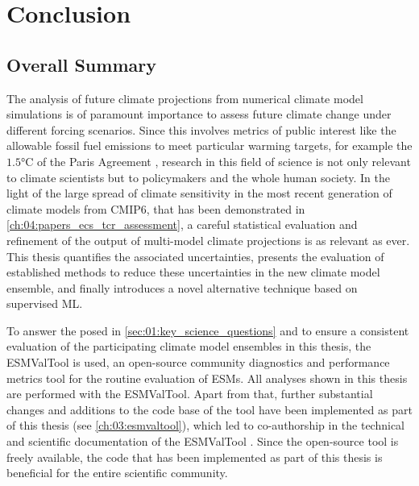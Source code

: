 
%



\chapter{Conclusion}
\label{ch:07:conclusion}


\section{Overall Summary}
\label{sec:07:overall_summary}

The analysis of future climate projections from numerical climate model
simulations is of paramount importance to assess future climate change under
different forcing scenarios. Since this involves metrics of public interest
like the allowable fossil fuel emissions to meet particular warming targets,
for example the $1.5 \unit{\degreeCelsius}$ of the Paris Agreement
\autocite{UNFCCC2015}, research in this field of science is not only relevant
to climate scientists but to policymakers and the whole human society. In the
light of the large spread of climate sensitivity in the most recent generation
of climate models from \acs{CMIP}6, that has been demonstrated in
\cref{ch:04:papers_ecs_tcr_assessment}, a careful statistical evaluation and
refinement of the output of multi-model climate projections is as relevant as
ever. This thesis quantifies the associated uncertainties, presents the
evaluation of established methods to reduce these uncertainties in the new
climate model ensemble, and finally introduces a novel alternative technique
based on supervised \ac{ML}.

To answer the  posed in
\cref{sec:01:key_science_questions} and to ensure a consistent evaluation of
the participating climate model ensembles in this thesis, the \ac{ESMValTool}
is used, an open-source community diagnostics and performance metrics tool for
the routine evaluation of \acp{ESM}. All analyses shown in this thesis are
performed with the \ac{ESMValTool}. Apart from that, further substantial
changes and additions to the code base of the tool have been implemented as
part of this thesis (see \cref{ch:03:esmvaltool}), which led to co-authorship
in the technical and scientific documentation of the \ac{ESMValTool}
\autocite{Eyring2020, Lauer2020, Righi2020, Weigel2020}. Since the open-source
tool is freely available, the code that has been implemented as part of this
thesis is beneficial for the entire scientific community.

